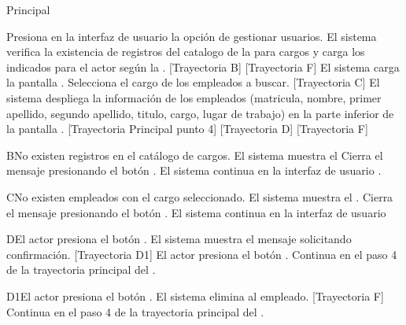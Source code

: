 \begin{UCtrayectoria}{Principal}
	
	\UCpaso[\UCactor] Presiona en la interfaz de usuario  la opción de gestionar usuarios. 
	\UCpaso  El sistema verifica la existencia de registros del catalogo de la  para cargos  y carga los indicados para el actor según la  . [Trayectoria B] [Trayectoria F] 
	\UCpaso El sistema carga la pantalla  .
	\UCpaso[\UCactor] Selecciona el cargo de los empleados a buscar. [Trayectoria C] 
	\UCpaso El sistema despliega la información de los empleados (matricula,  nombre, primer apellido, segundo apellido, titulo, cargo, lugar de trabajo) en la parte inferior de la pantalla . [Trayectoria Principal punto 4] [Trayectoria D] [Trayectoria F] 
\end{UCtrayectoria}

\begin{UCtrayectoriaA}{B}{No existen registros en el catálogo de cargos.}
	\UCpaso     El sistema muestra el 	
	\UCpaso[\UCactor] Cierra el mensaje presionando el botón .
	\UCpaso  El sistema continua en la interfaz de usuario .
\end{UCtrayectoriaA}

\begin{UCtrayectoriaA}{C}{No existen  empleados con el cargo seleccionado.}
	\UCpaso     El sistema muestra el .
	\UCpaso[\UCactor] Cierra el mensaje presionando el botón .
	\UCpaso  El sistema continua en la interfaz de usuario   
\end{UCtrayectoriaA}


\begin{UCtrayectoriaA}{D}{El actor presiona el botón .}
	\UCpaso El sistema muestra el mensaje  solicitando confirmación. [Trayectoria D1]
	\UCpaso[\UCactor] El actor presiona el botón .
	\UCpaso Continua en el paso 4 de la trayectoria principal del .  	
\end{UCtrayectoriaA}

\begin{UCtrayectoriaA}{D1}{El actor presiona el botón .}
	\UCpaso     El sistema elimina al empleado. [Trayectoria F] 
	\UCpaso Continua en el paso 4 de la trayectoria principal del .  
\end{UCtrayectoriaA}


